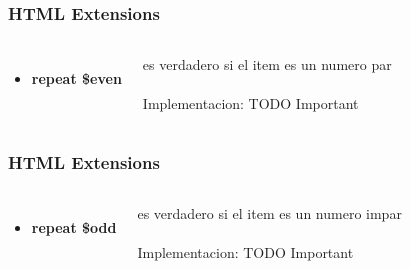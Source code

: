\documentclass{beamer}
\begin{document}
\begin{frame}
\frametitle{HTML Extensions}
\begin{columns}[c]
\begin{itemize}
\item \textbf{repeat \$even}
\end{itemize}

es verdadero si el item es un numero par
\\~\\
Implementacion: TODO Important
\end{columns}
\end{frame}
\begin{frame}
\frametitle{HTML Extensions}
\begin{columns}[c]
\begin{itemize}
\item \textbf{repeat \$odd}
\end{itemize}

es verdadero si el item es un numero impar
\\~\\
Implementacion: TODO Important
\end{columns}
\end{frame}


\end{document}

